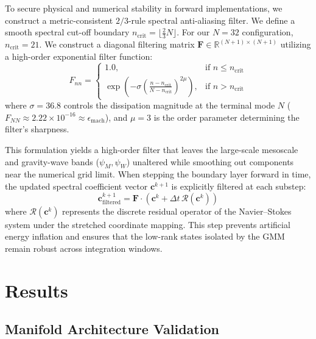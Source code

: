 \documentclass[11pt,a4paper]{article}
\begin{document}
To secure physical and numerical stability in forward implementations, we construct a metric-consistent $2/3$-rule spectral anti-aliasing filter. We define a smooth spectral cut-off boundary $n_{\mathrm{crit}} = \lfloor \frac{2}{3} N \rfloor$. For our $N=32$ configuration, $n_{\mathrm{crit}} = 21$. We construct a diagonal filtering matrix $\mathbf{F} \in \mathbb{R}^{(N+1) \times (N+1)}$ utilizing a high-order exponential filter function:
\begin{equation}
F_{nn} = \begin{cases}
1.0, & \text{if } n \le n_{\mathrm{crit}} \\
\exp\left( -\sigma \left( \frac{n - n_{\mathrm{crit}}}{N - n_{\mathrm{crit}}} \right)^{\! 2\mu} \right), & \text{if } n > n_{\mathrm{crit}}
\end{cases}
\label{eq:exponential_filter}
\end{equation}
where $\sigma = 36.8$ controls the dissipation magnitude at the terminal mode $N$ ($F_{NN} \approx 2.22 \times 10^{-16} \approx \epsilon_{\mathrm{mach}}$), and $\mu = 3$ is the order parameter determining the filter's sharpness. 

This formulation yields a high-order filter that leaves the large-scale mesoscale and gravity-wave bands ($\psi_M, \psi_W$) unaltered while smoothing out components near the numerical grid limit. When stepping the boundary layer forward in time, the updated spectral coefficient vector $\mathbf{c}^{k+1}$ is explicitly filtered at each substep:
\begin{equation}
\mathbf{c}^{k+1}_{\mathrm{filtered}} = \mathbf{F} \cdot \left( \mathbf{c}^k + \Delta t \, \mathbf{\mathcal{R}}(\mathbf{c}^k) \right)
\label{eq:filtered_time_step}
\end{equation}
where $\mathbf{\mathcal{R}}(\mathbf{c}^k)$ represents the discrete residual operator of the Navier--Stokes system under the stretched coordinate mapping. This step prevents artificial energy inflation and ensures that the low-rank states isolated by the GMM remain robust across integration windows.

\section{Results}
\label{sec:results}

\subsection{Manifold Architecture Validation}
\label{sec:results:manifold}
\end{document}
